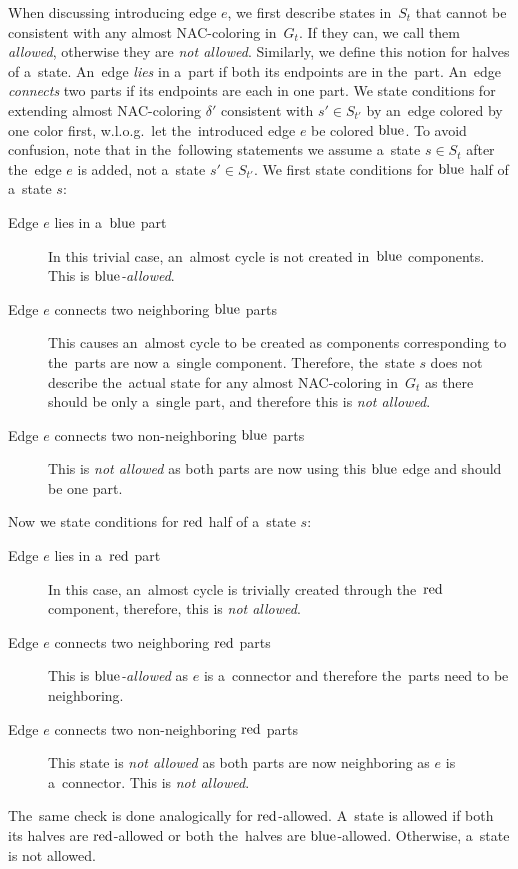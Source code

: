 When discussing \IntroduceEdgeNode{} introducing edge \( e \),
we first describe states in~\( S_{t} \)
that cannot be consistent with any almost NAC-coloring in~\( G_t \).
If they can, we call them \emph{allowed}, otherwise they are \emph{not allowed}.
Similarly, we define this notion for halves of a~state.
%
An~edge \emph{lies} in a~part if both its endpoints are in the~part.
An~edge \emph{connects} two parts if its endpoints are each in one part.
%
We state conditions for extending almost NAC-coloring \( \delta' \)
consistent with \( s' \in S_{t'} \)
by an~edge colored by one color first,
w.l.o.g.\ let the~introduced edge \( e \) be colored \( \text{blue} \).
%
To avoid confusion, note that in the~following statements we assume
a~state \( s \in S_t \) after the~edge \( e \) is added, not a~state \( s' \in S_{t'} \).
%
We first state conditions for \( \text{blue} \) half of a~state \( s \):
%
\begin{description}
	\item[Edge \( e \) lies in a~\( \text{blue} \) part]
	      In this trivial case, an~almost cycle is not created in~\( \text{blue} \) components.
	      This is \emph{\( \text{blue} \)-allowed}.
	\item[Edge \( e \) connects two neighboring \( \text{blue} \) parts]
	      This causes an~almost cycle to be created as
	      components corresponding to the~parts
	      are now a~single component.
	      Therefore, the~state \( s \) does not describe
	      the~actual state for any almost NAC-coloring in~\( G_t \)
	      as there should be only a~single part, and therefore this is \emph{not allowed}.
	\item[Edge \( e \) connects two non-neighboring \( \text{blue} \) parts]
	      This is \emph{not allowed} as both parts
	      are now using this \( \text{blue} \) edge and should be one part.
\end{description}
%
Now we state conditions for \( \text{red} \) half of a~state \( s \):
%
\begin{description}
	\item[Edge \( e \) lies in a~\( \text{red} \) part]
	      In this case, an~almost cycle is trivially created
	      through the~\( \text{red} \) component,
	      therefore, this is \emph{not allowed}.
	\item[Edge \( e \) connects two neighboring \( \text{red} \) parts]
	      This is \emph{\( \text{blue} \)-allowed} as \( e \) is a~connector and
	      therefore the~parts need to be neighboring.
	\item[Edge \( e \) connects two non-neighboring \( \text{red} \) parts]
	      This state is \emph{not allowed} as both parts
	      are now neighboring as \( e \) is a~connector.
	      This is \emph{not allowed}.
\end{description}
%
The~same check is done analogically for \( \text{red} \)-allowed.
A~state is allowed if both its halves are \( \text{red} \)-allowed or
both the~halves are \( \text{blue} \)-allowed.
Otherwise, a~state is not allowed.

